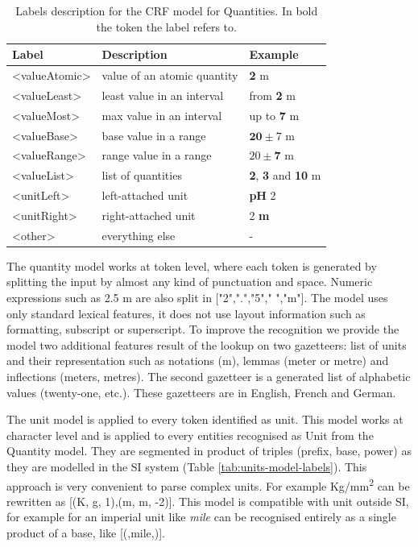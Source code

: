 \documentclass[sigconf]{acmart}
\begin{document}
\begin{table}
  \caption{Labels description for the CRF model for Quantities. In bold the token the label refers to.}
  \label{tab:quantities-model-labels}
  \begin{tabular}{lll}
    \toprule
    Label & Description & Example\\
    \midrule
    <valueAtomic> & value of an atomic quantity & \textbf{2} m \\
    <valueLeast> & least value in an interval & from \textbf{2} m \\
    <valueMost> & max value in an interval & up to \textbf{7} m \\
    <valueBase> & base value in a range & $\textbf{20}\pm7$ m \\
    <valueRange> & range value in a range & $20 \pm \textbf{7}$ m \\
    <valueList> & list of quantities & \textbf{2}, \textbf{3} and \textbf{10} m \\
    <unitLeft> & left-attached unit & \textbf{pH} 2 \\
    <unitRight> & right-attached unit & 2 \textbf{m} \\
    <other> & everything else & - \\
  \bottomrule
\end{tabular}
\end{table}

The quantity model works at token level, where each token is generated by splitting the input by almost any kind of punctuation and space. Numeric expressions such as 2.5 m are also split in ["2",".","5"," ","m"]. The model uses only standard lexical features, it does not use layout information such as formatting, subscript or superscript. 
To improve the recognition we provide the model two additional features result of the lookup on two gazetteers: list of units and their representation such as notations (m), lemmas (meter or metre) and inflections (meters, metres). The second gazetteer is a generated list of alphabetic values (twenty-one, etc.). These gazetteers are in English, French and German. 

The unit model is applied to every token identified as unit. This model works at character level and is applied to every entities recognised as Unit from the Quantity model. They are segmented in product of triples (prefix, base, power) as they are modelled in the SI system (Table \ref{tab:units-model-labels}). This approach is very convenient to parse complex units. For example Kg/mm\textsuperscript{2} can be rewritten as [(K, g, 1),(m, m, -2)]. This model is compatible with unit outside SI, for example for an imperial unit like \textit{mile} can be recognised entirely as a single product of a base, like [(,mile,)].
\end{document}
